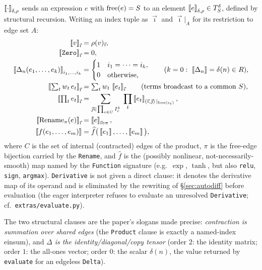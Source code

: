 \documentclass[sigplan,10pt,review]{acmart}
\begin{document}
\begin{definition}[Evaluation]\label{def:eval}
$\left[\!\left[\cdot\right]\!\right]_{\delta,\rho}$ sends an expression $e$ with
$\operatorname{free}(e)=S$ to an element $\left[\!\left[e\right]\!\right]_{\delta,\rho}\in T^{\delta}_{S}$,
defined by structural recursion. Writing an index tuple as $\vec\imath$
and $\vec\imath|_A$ for its restriction to edge set $A$:
\begin{align*}
\sem{v}_{\vec\imath} &= \rho(v)_{\vec\imath}, \\[-1pt]
\sem{\texttt{Zero}}_{\vec\imath} &= 0, \\[-1pt]
\sem{\Delta_n(e_1,\dots,e_k)}_{i_1,\dots,i_k}
   &= \begin{cases} 1 & i_1=\cdots=i_k,\\ 0 & \text{otherwise,}\end{cases}
   \qquad (k=0:\ \sem{\Delta_n}=\delta(n)\in R),\\[-1pt]
\sem{\textstyle\sum_t w_t\, e_t}_{\vec\imath}
   &= \textstyle\sum_t w_t\,\sem{e_t}_{\vec\imath}
     \qquad (\text{terms broadcast to a common }S),\\[-1pt]
\sem{\textstyle\prod_t e_t}_{\vec\imath}
   &= \sum_{\vec\jmath\in \prod_{c\in C} I_c^{\delta}}\;
      \prod_t \sem{e_t}_{(\vec\imath,\vec\jmath)\,|_{\Free(e_t)}},\\[-1pt]
\sem{\mathrm{Rename}_{\pi}(e)}_{\vec\imath}
   &= \sem{e}_{\vec\imath\circ\pi},\\[-1pt]
\sem{f(e_1,\dots,e_m)}
   &= \widehat{f}\big(\sem{e_1},\dots,\sem{e_m}\big),
\end{align*}
where $C$ is the set of internal (contracted) edges of the product,
$\pi$ is the free-edge bijection carried by the \texttt{Rename}, and
$\widehat f$ is the (possibly nonlinear, not-necessarily-smooth) map
named by the \texttt{Function} signature (e.g.\ $\exp$, $\tanh$, but
also \texttt{relu}, \texttt{sign}, \texttt{argmax}). \texttt{Derivative} is not given a
direct clause: it denotes the derivative map of its operand and is
eliminated by the rewriting of \S\ref{sec:autodiff} before evaluation
(the eager interpreter refuses to evaluate an unresolved
\texttt{Derivative}; cf.\ \texttt{extras/evaluate.py}).
\end{definition}

The two structural clauses are the paper's slogans made precise:
\emph{contraction is summation over shared edges} (the \texttt{Product}
clause is exactly a named-index einsum), and \emph{$\Delta$ is the
identity/diagonal/copy tensor} (order $2$: the identity matrix; order
$1$: the all-ones vector; order $0$: the scalar $\delta(n)$, the value
returned by \texttt{evaluate} for an edgeless \texttt{Delta}).
\end{document}

